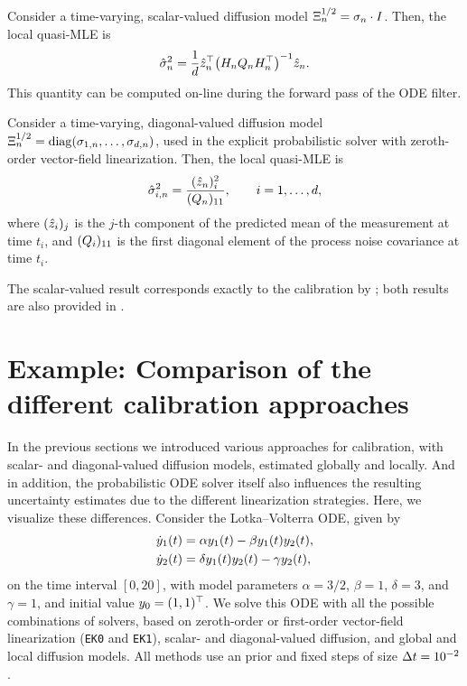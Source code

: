 \documentclass{mimosis}
\begin{document}
\begin{proposition}
Consider a time-varying, scalar-valued diffusion model
\(\Xi^{1/2}_n = \sigma_n \cdot I\).
Then, the local quasi-MLE is
\begin{equation}
  \hat{\sdiff}_n^2 = \frac{1}{d} \hat{\obs}_n^\T \left( \obsA_n \transC_n \obsA_n^\T \right)^{-1} \hat{\obs}_n.
\end{equation}
This quantity can be computed on-line during the forward pass of the ODE filter.
\label{prop:localscalar}
\end{proposition}

\begin{proposition}
Consider a time-varying, diagonal-valued diffusion model
\(\Diff_n = \diag(\sdiff_{1,n}, \dots, \sdiff_{d,n})\), used in the explicit probabilistic solver with zeroth-order vector-field linearization.
Then, the local quasi-MLE is
\begin{equation}
  \hat{\sigma}_{i,n}^2 = \frac{ (\hat{z}_n)_i^2 }{ (Q_n)_{11} }, \qquad i = 1, \dots, d,
\end{equation}
where \((\hat{z}_i)_j\) is the \(j\)-th component of the predicted mean of the measurement at time \(t_i\), and \((Q_i)_{11}\) is the first diagonal element of the process noise covariance at time \(t_i\).
\label{prop:localdiag}
\end{proposition}
The scalar-valued result corresponds exactly to the calibration by
\textcite{schober16_probab_model_numer_solut_initial_value_probl};
both results are also provided in
\capos{}.
\section{Example: Comparison of the different calibration approaches}
\label{sec:orgf7b59db}
In the previous sections we introduced various approaches for calibration, with scalar- and diagonal-valued diffusion models, estimated globally and locally.
And in addition, the probabilistic ODE solver itself also influences the resulting uncertainty estimates due to the different linearization strategies.
Here, we visualize these differences.
Consider the Lotka--Volterra ODE, given by
\begin{subequations}
\begin{align}
  \dot{y}_1(t) &= \alpha y_1(t) - \beta y_1(t) y_2(t), \\
  \dot{y}_2(t) &= \delta y_1(t) y_2(t) - \gamma y_2(t),
\end{align}
\end{subequations}
on the time interval \([0, 20]\),
with model parameters \(\alpha = 3/2\), \(\beta = 1\), \(\delta = 3\), and \(\gamma = 1\),
and initial value \(y_0 = (1, 1)^\top\).
We solve this ODE with all the possible combinations of
solvers, based on zeroth-order or first-order vector-field linearization (\texttt{EK0} and \texttt{EK1}),
scalar- and diagonal-valued diffusion,
and global and local diffusion models.
All methods use an  prior and fixed steps of size \({\Delta t} = 10^{-2}\).
\end{document}
